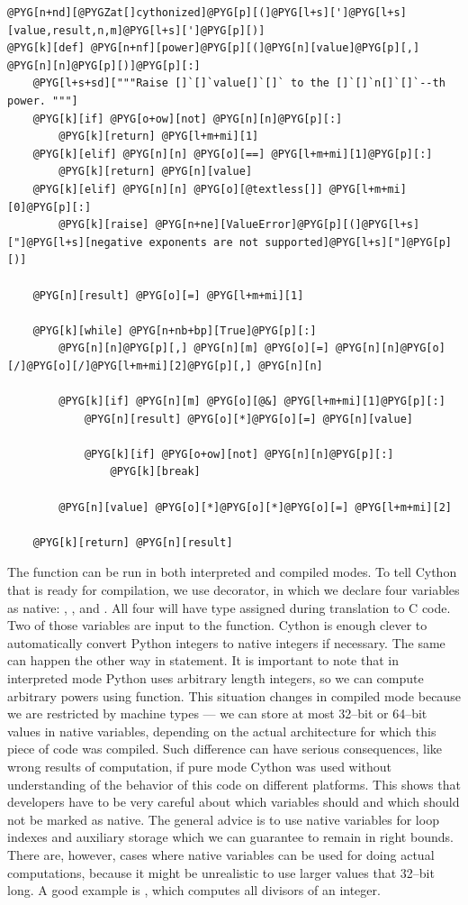 \begin{Verbatim}[commandchars=@\[\]]
@PYG[n+nd][@PYGZat[]cythonized]@PYG[p][(]@PYG[l+s][']@PYG[l+s][value,result,n,m]@PYG[l+s][']@PYG[p][)]
@PYG[k][def] @PYG[n+nf][power]@PYG[p][(]@PYG[n][value]@PYG[p][,] @PYG[n][n]@PYG[p][)]@PYG[p][:]
    @PYG[l+s+sd]["""Raise []`[]`value[]`[]` to the []`[]`n[]`[]`--th power. """]
    @PYG[k][if] @PYG[o+ow][not] @PYG[n][n]@PYG[p][:]
        @PYG[k][return] @PYG[l+m+mi][1]
    @PYG[k][elif] @PYG[n][n] @PYG[o][==] @PYG[l+m+mi][1]@PYG[p][:]
        @PYG[k][return] @PYG[n][value]
    @PYG[k][elif] @PYG[n][n] @PYG[o][@textless[]] @PYG[l+m+mi][0]@PYG[p][:]
        @PYG[k][raise] @PYG[n+ne][ValueError]@PYG[p][(]@PYG[l+s]["]@PYG[l+s][negative exponents are not supported]@PYG[l+s]["]@PYG[p][)]

    @PYG[n][result] @PYG[o][=] @PYG[l+m+mi][1]

    @PYG[k][while] @PYG[n+nb+bp][True]@PYG[p][:]
        @PYG[n][n]@PYG[p][,] @PYG[n][m] @PYG[o][=] @PYG[n][n]@PYG[o][/]@PYG[o][/]@PYG[l+m+mi][2]@PYG[p][,] @PYG[n][n]

        @PYG[k][if] @PYG[n][m] @PYG[o][@&] @PYG[l+m+mi][1]@PYG[p][:]
            @PYG[n][result] @PYG[o][*]@PYG[o][=] @PYG[n][value]

            @PYG[k][if] @PYG[o+ow][not] @PYG[n][n]@PYG[p][:]
                @PYG[k][break]

        @PYG[n][value] @PYG[o][*]@PYG[o][*]@PYG[o][=] @PYG[l+m+mi][2]

    @PYG[k][return] @PYG[n][result]
\end{Verbatim}
\noindent
The function can be run in both interpreted and compiled modes. To tell Cython that 
is ready for compilation, we use  decorator, in which we declare four variables as
native: , ,  and . All four will have  type assigned during
translation to C code. Two of those variables are input to the function. Cython is enough clever
to automatically convert Python integers to native integers if necessary. The same can happen the
other way in  statement. It is important to note that in interpreted mode Python uses
arbitrary length integers, so we can compute arbitrary powers using  function. This
situation changes in compiled mode because we are restricted by machine types --- we can store
at most 32--bit or 64--bit values in native variables, depending on the actual architecture for
which this piece of code was compiled. Such difference can have serious consequences, like wrong
results of computation, if pure mode Cython was used without understanding of the behavior of this
code on different platforms. This shows that developers have to be very careful about which variables
should and which should not be marked as native. The general advice is to use native variables for
loop indexes and auxiliary storage which we can guarantee to remain in right bounds. There are,
however, cases where native variables can be used for doing actual computations, because it
might be unrealistic to use larger values that 32--bit long. A good example is ,
which computes all divisors of an integer.

